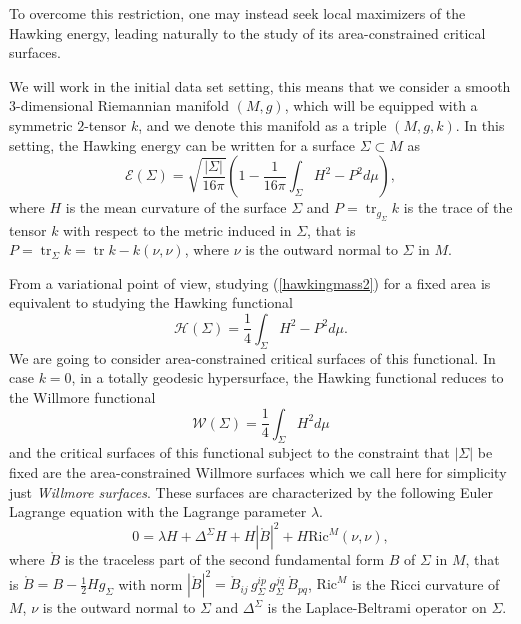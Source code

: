\documentclass[12pt,a4paper]{amsart}
\theoremstyle{plain}
\theoremstyle{definition}
\newcommand{\tr}{\operatorname{tr}}
\begin{document}
To overcome this restriction, one may instead seek local maximizers of the Hawking energy, leading naturally to the study of its area-constrained critical surfaces.



We will work in the initial data set setting, this means that we consider a smooth $3$-dimensional Riemannian manifold $(M,g)$, which will be equipped with a symmetric $2$-tensor $k$, and we denote this manifold as a triple $(M,g,k)$.   In this setting, the Hawking energy can be written for a surface $\Sigma \subset M $ as
\begin{equation}\label{hawkingmass2}
    \mathcal{E}(\Sigma) = \sqrt{\frac{|\Sigma|}{16 \pi}} \left( 1- \frac{1}{16 \pi} \int_\Sigma H^2 - P^2 d\mu \right),
\end{equation}
where $H$ is the mean curvature of the surface $\Sigma$ and   $P=\tr_{g_{\Sigma}} k$ is the trace of the tensor $k$ with respect to the metric induced in $\Sigma$, that is  $P= \tr_\Sigma k= \tr k -k(\nu,\nu)$, where $\nu$ is the outward  normal to $\Sigma$ in $M$. 

From a variational point of view,  studying (\ref{hawkingmass2}) for a fixed area is equivalent to studying the Hawking functional 
\begin{equation}\label{hawfun}
    \mathcal{H}(\Sigma)= \frac{1}{4} \int_\Sigma H^2 - P^2 d\mu.
\end{equation}
We are going to consider area-constrained critical surfaces of this functional. In case $k=0$, in a totally geodesic hypersurface, the Hawking functional reduces to the Willmore functional 
\begin{equation}\label{willfunc}
    \mathcal{W}(\Sigma)= \frac{1}{4} \int_\Sigma H^2  d\mu 
\end{equation}
and the critical surfaces of this functional subject to the constraint that $|\Sigma| $ be fixed are the area-constrained Willmore surfaces which we call here for simplicity just \emph{Willmore surfaces}. These surfaces are characterized by the following Euler Lagrange equation with the Lagrange parameter $\lambda$.
\begin{equation}\label{Willeq}
    0= \lambda H  +\Delta^\Sigma H + H|\mathring{B}|^2+ H \mathrm{Ric}^M(\nu, \nu), 
\end{equation}
where $\mathring{B}$   is the traceless part of the second
fundamental form $B$ of $\Sigma$ in $M$, that is $ \mathring{B} = B- \frac{1}{2} H g_\Sigma$ with norm  $|\mathring{B}|^2 = \mathring{B}_{ij}\, g_\Sigma^{ip}\, g_\Sigma^{jq}\, \mathring{B}_{pq}$,  $\mathrm{Ric}^M$ is the Ricci curvature of $M$, $\nu$ is the outward normal to $\Sigma$  and $\Delta^\Sigma $ is the Laplace-Beltrami operator on $\Sigma$.
\end{document}
